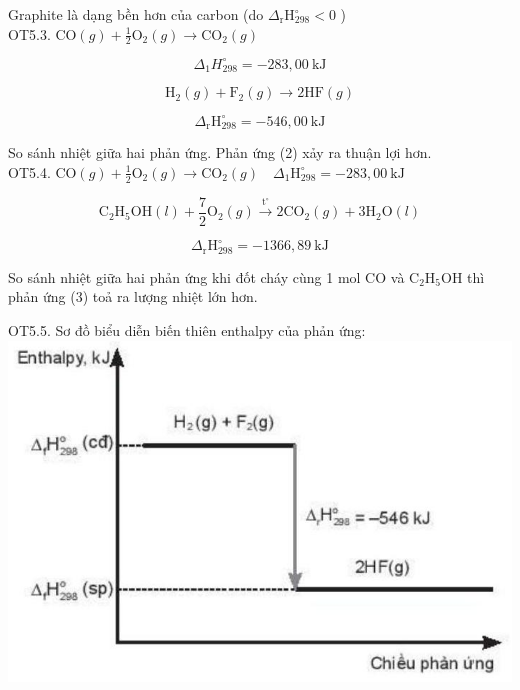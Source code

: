 \documentclass[10pt]{article}
\begin{document}
Graphite là dạng bền hơn của carbon (do $\Delta_{\mathrm{r}} \mathrm{H}_{298}^{\circ}<0$ )\\
OT5.3. $\mathrm{CO}(g)+\frac{1}{2} \mathrm{O}_{2}(g) \rightarrow \mathrm{CO}_{2}(g)$


\begin{equation*}
\Delta_{1} H_{298}^{\circ}=-283,00 \mathrm{~kJ} \tag{1}
\end{equation*}



\begin{equation*}
\mathrm{H}_{2}(g)+\mathrm{F}_{2}(g) \rightarrow 2 \mathrm{HF}(g) \tag{2}
\end{equation*}


$$
\Delta_{\mathrm{r}} \mathrm{H}_{298}^{\circ}=-546,00 \mathrm{~kJ}
$$

So sánh nhiệt giữa hai phản ứng. Phản ứng (2) xảy ra thuận lợi hơn.\\
OT5.4. $\mathrm{CO}(g)+\frac{1}{2} \mathrm{O}_{2}(g) \rightarrow \mathrm{CO}_{2}(g) \quad \Delta_{1} \mathrm{H}_{298}^{\circ}=-283,00 \mathrm{~kJ}$


\begin{equation*}
\mathrm{C}_{2} \mathrm{H}_{5} \mathrm{OH}(l)+\frac{7}{2} \mathrm{O}_{2}(g) \xrightarrow{\mathrm{t}^{\circ}} 2 \mathrm{CO}_{2}(g)+3 \mathrm{H}_{2} \mathrm{O}(l) \tag{1}
\end{equation*}



\begin{equation*}
\Delta_{\mathrm{r}} \mathrm{H}_{298}^{\circ}=-1366,89 \mathrm{~kJ} \tag{3}
\end{equation*}


So sánh nhiệt giữa hai phản ứng khi đốt cháy cùng 1 mol CO và $\mathrm{C}_{2} \mathrm{H}_{5} \mathrm{OH}$ thì phản ứng (3) toả ra lượng nhiệt lớn hơn.

OT5.5. Sơ đồ biểu diễn biến thiên enthalpy của phản ứng:\\
\includegraphics[max width=\textwidth, center]{2025_10_23_57761e23b8c46a11c3efg-45}
\end{document}
